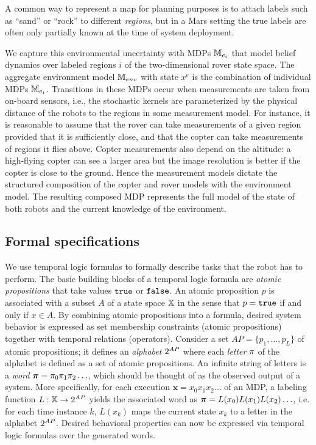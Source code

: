 \documentclass[conference]{IEEEtran}
\begin{document}
\smallskip
{}
A common way to represent a map for planning purposes is to attach labels such as ``sand'' or ``rock'' to different \emph{regions}, but in a Mars setting the true labels are often only partially known at the time of system deployment.

We capture this environmental uncertainty with MDPs $\mathbb{M}_{e_i}$ that model belief dynamics over labeled regions $i$ of the two-dimensional rover state space. The aggregate environment model $\mathbb{M}_{env}$ with state $x^e$ is the combination of individual MDPs $\mathbb{M}_{e_i}$. Transitions in these MDPs occur when measurements are taken from on-board sensors, i.e., the stochastic kernels are parameterized by the physical distance of the robots to the regions in some measurement model. For instance, it is reasonable to assume that the rover can take measurements of a given region provided that it is sufficiently close, and that the copter can take measurements of regions it flies above. Copter measurements also depend on the altitude: a high-flying copter can see a larger area but the image resolution is better if the copter is close to the ground. Hence the measurement models dictate the structured composition of the copter and rover models with the environment model. The resulting composed MDP represents the full model of the state of both robots and the current knowledge of the environment.

\subsection{Formal specifications}
We use temporal logic formulas to formally describe tasks that the robot has to perform.
The basic building blocks of a temporal logic formula are \emph{atomic propositions} that take values $\texttt{true}$ or $\texttt{false}$.  An atomic proposition $p$ is associated with a subset $A$ of a state space $\mathbb{X}$ in the sense that $p = \texttt{true}$ if and only if $x \in A$.
By combining atomic propositions into a formula, desired system behavior is expressed as set membership constraints (atomic propositions) together with temporal relations (operators). Consider a set $AP = \{ p_1, \ldots, p_L \}$ of atomic propositions; it defines an \emph{alphabet} ${2^{AP}}$ where each \emph{letter} $\pi$ of the alphabet is defined as a set of atomic propositions. An infinite string of letters is a \emph{word} $\boldsymbol{\pi}=\pi_0\pi_1\pi_2\ldots$, which should be thought of as the observed output of a system. More specifically, for each execution $\mathbf{x} = x_0 x_1 x_2 \ldots$ of an MDP, a
labeling function $L: \mathbb{X} \rightarrow {2^{AP}}$ yields the associated word as $\boldsymbol{\pi} = L(x_0)L(x_1) L(x_2) \ldots$, i.e. for each time instance $k$, $L(x_k)$ maps the current state $x_k$ to a letter in the alphabet ${2^{AP}}$. Desired behavioral properties can now be expressed via temporal logic formulas over the generated words.
\end{document}
